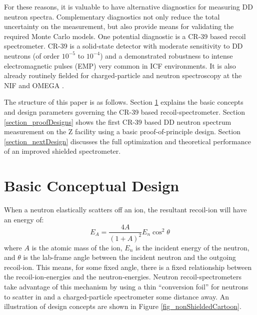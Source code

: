 For these reasons, it is valuable to have alternative diagnostics for measuring DD neutron spectra. Complementary diagnostics not only reduce the total uncertainty on the measurement, but also provide means for validating the required Monte Carlo models. One potential diagnostic is a CR-39 based recoil spectrometer. CR-39 is a solid-state detector with moderate sensitivity to DD neutrons (of order $10^{-5}$ to $10^{-4}$) and a demonstrated robustness to intense electromagnetic pulses (EMP) very common in ICF environments. \cite{Frenje_RSI_2002} It is also already routinely fielded for charged-particle and neutron spectroscopy at the NIF and OMEGA \cite{Seguin_RSI_2003, Seguin_RSI_2004, Frenje_RSI_2008, Zylstra_RSI_2012_2, Seguin_RSI_2012, Gatu-Johnson_RSI_2012, Casey_RSI_2012, Seguin_DDn_Spectrometer, Casey_RSI_2013, Rosenberg_RSI_2014}.

The structure of this paper is as follows. Section \ref{section_basicDesign} explains the basic concepts and design parameters governing the CR-39 based recoil-spectrometer. Section \ref{section_proofDesigns} shows the first CR-39 based DD neutron spectrum measurement on the Z facility using a basic proof-of-principle design. Section \ref{section_nextDesign}  discusses the full optimization and theoretical performance of an improved shielded spectrometer. 



\section{Basic Conceptual Design}
\label{section_basicDesign}

When a neutron elastically scatters off an ion, the resultant recoil-ion will have an energy of:
%
\begin{equation}
	E_A = \frac{4A}{(1+A)^2}E_n \cos^2\theta
	\label{eq_neutronKinematics}
\end{equation}
%
where $A$ is the atomic mass of the ion, $E_n$ is the incident energy of the neutron, and $\theta$ is the lab-frame angle between the incident neutron and the outgoing recoil-ion. This means, for some fixed angle, there is a fixed relationship between the recoil-ion-energies and the neutron-energies. Neutron recoil-spectrometers take advantage of this mechanism by using a thin ``conversion foil'' for neutrons to scatter in and a charged-particle spectrometer some distance away. An illustration of design concepts are shown in Figure \ref{fig_nonShieldedCartoon}.

